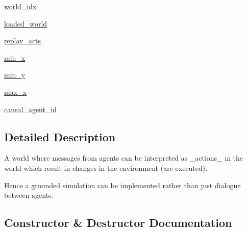 \begin{DoxyCompactItemize}
\item 
\hyperlink{classparlai_1_1mturk_1_1tasks_1_1talkthewalk_1_1worlds_1_1TalkTheWalkWorld_accdd40d13555e0b8a176d231516787e7}{world\+\_\+idx}
\item 
\hyperlink{classparlai_1_1mturk_1_1tasks_1_1talkthewalk_1_1worlds_1_1TalkTheWalkWorld_a0bc364a0da29e44f84ffeafa0705284c}{loaded\+\_\+world}
\item 
\hyperlink{classparlai_1_1mturk_1_1tasks_1_1talkthewalk_1_1worlds_1_1TalkTheWalkWorld_acf3ae52f81d26805366899e552c602f3}{replay\+\_\+acts}
\item 
\hyperlink{classparlai_1_1mturk_1_1tasks_1_1talkthewalk_1_1worlds_1_1TalkTheWalkWorld_a052a53941b53e0cc5cf2494d8a78d24a}{min\+\_\+x}
\item 
\hyperlink{classparlai_1_1mturk_1_1tasks_1_1talkthewalk_1_1worlds_1_1TalkTheWalkWorld_a62b94a1c38611e9c7db1dfb9dcb1da69}{min\+\_\+y}
\item 
\hyperlink{classparlai_1_1mturk_1_1tasks_1_1talkthewalk_1_1worlds_1_1TalkTheWalkWorld_aec3ffde8ab0a1ba2fd964155667047fa}{max\+\_\+x}
\item 
\hyperlink{classparlai_1_1mturk_1_1tasks_1_1talkthewalk_1_1worlds_1_1TalkTheWalkWorld_ac4bfaadcf06926e60538ea1cbe39136a}{causal\+\_\+agent\+\_\+id}
\end{DoxyCompactItemize}


\subsection{Detailed Description}
\begin{DoxyVerb}A world where messages from agents can be interpreted as _actions_ in the world
which result in changes in the environment (are executed).

Hence a grounded simulation can be implemented rather than just dialogue between
agents.
\end{DoxyVerb}
 

\subsection{Constructor \& Destructor Documentation}
\mbox{\label{classparlai_1_1mturk_1_1tasks_1_1talkthewalk_1_1worlds_1_1TalkTheWalkWorld_a2bf246c349a56c3dc43e1caff2241c3b}} 
